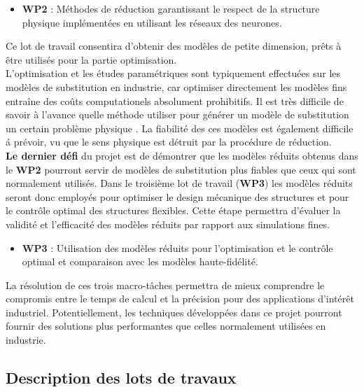 \documentclass[12pt, french]{article}
\begin{document}
\begin{itemize}
	\item \textbf{WP2} : Méthodes de réduction garantissant le respect de la structure physique implémentées en utilisant les réseaux des neurones.\\
\end{itemize}

Ce lot de travail consentira d'obtenir des modèles de petite dimension, prêts à être utilisés pour la partie optimisation.\\ 

L'optimisation et les études paramétriques sont typiquement effectuées sur les
modèles de substitution en industrie, car optimiser directement les modèles fins entraîne des coûts computationels absolument prohibitifs. Il est très difficile de savoir \`a l'avance quelle méthode utiliser pour générer un modèle de substitution un certain problème physique \cite{lancaster2018}. La fiabilité des ces modèles est également difficile \'a prévoir, vu que le sens physique est détruit par la procédure de réduction. \\
\textbf{Le dernier défi} du projet est de démontrer que les modèles réduits obtenus dans le \textbf{WP2} pourront servir de modèles de substitution plus fiables que ceux qui sont normalement utilisés. Dans le troisième lot de travail (\textbf{WP3}) les modèles réduits seront donc employés pour optimiser le design mécanique des structures et pour le contrôle optimal des structures flexibles. Cette étape permettra d’évaluer la validité et l’efficacité des modèles réduits par rapport aux simulations fines. \\

	\begin{itemize}
		\item \textbf{WP3} : Utilisation des modèles réduits pour l'optimisation et le contrôle optimal et comparaison avec les  modèles haute-fidélité. \\
	\end{itemize}
	
La résolution de ces trois macro-tâches permettra de mieux comprendre le compromis entre le temps de calcul et la précision pour des applications d'intérêt industriel. Potentiellement, les techniques développées dans ce projet pourront fournir des solutions plus performantes que celles normalement utilisées en industrie. 

\subsection{Description des lots de travaux}
	
\end{document}
